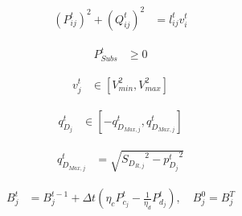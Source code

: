 \documentclass[../../outputs/main.tex]{subfiles}
\begin{document}
\vspace{-1.5em} %

\begin{align}
    {(P_{ij}^{t})^2 + (Q_{ij}^{t})^2} &= {l_{ij}^t v_i^t} 
    \label{eq:ApparentPowerEquationBFM}
\end{align}

\vspace{-2.0em} %

\begin{align}
    {P^t_{Subs}} &\geq {0} \label{eq:substationRealPowerLimits}
\end{align}

\vspace{-2.0em} %

\begin{align}
    { v^{t}_{j} } &\in { \left[ V^{2}_{min}, V^{2}_{max} \right]} \label{eq:lim_vj}
\end{align}

\vspace{-1.5em} %


\begin{align}
    { q^{t}_{D_{j}} } 
    &\in
    { \left[-q_{D_{Max, j}}^{t}, q_{D_{Max, j}}^{t}\right] } \label{eq:pv-inverter-reactive-power-limits-1ph}
\end{align}

\vspace{-1.5em} %

\begin{align}
    q_{D_{Max, j}}^{t} &= \sqrt{ {S_{D_{R, j}}}^2 - {p^{t}_{D_{j}}}^2} 
    \label{eq:pv-inverter-reactive-power-maximum-1ph}
\end{align}

\vspace{-1.5em} %

\begin{align}
    {B_{j}^{t}} &= {B_{j}^{t-1} + \Delta t \left( \eta_c P_{c_j}^t - \frac{1}{\eta_d} P_{d_j}^t \right)  }, \quad B_{j}^{0}=B_{j}^{T}  \label{eq:SOC-j}
\end{align}
\end{document}
